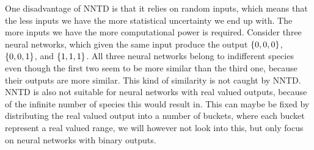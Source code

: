 One disadvantage of NNTD is that it relies on random inputs, which means that the less inputs we have the more statistical uncertainty we end up with. The more inputs we have the more computational power is required. Consider three neural networks, which given the same input produce the output $\{ 0, 0, 0 \}$, $\{ 0, 0, 1 \}$, and $\{ 1, 1, 1 \}$. All three neural networks belong to indifferent species even though the first two seem to be more similar than the third one, because their outputs are more similar. This kind of similarity is not caught by NNTD\@. NNTD is also not suitable for neural networks with real valued outputs, because of the infinite number of species this would result in. This can maybe be fixed by distributing the real valued output into a number of buckets, where each bucket represent a real valued range, we will however not look into this, but only focus on neural networks with binary outputs.
